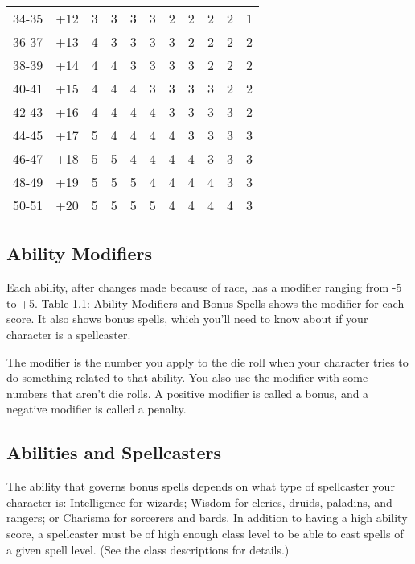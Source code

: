 \begin{table}[htb]
\begin{tabular}{*{11}{c}}
34-35 & +12 & 3 & 3 & 3 & 3 & 2 & 2 & 2 & 2 & 1\\
36-37 & +13 & 4 & 3 & 3 & 3 & 3 & 2 & 2 & 2 & 2\\
38-39 & +14 & 4 & 4 & 3 & 3 & 3 & 3 & 2 & 2 & 2\\
40-41 & +15 & 4 & 4 & 4 & 3 & 3 & 3 & 3 & 2 & 2\\
42-43 & +16 & 4 & 4 & 4 & 4 & 3 & 3 & 3 & 3 & 2\\
44-45 & +17 & 5 & 4 & 4 & 4 & 4 & 3 & 3 & 3 & 3\\
46-47 & +18 & 5 & 5 & 4 & 4 & 4 & 4 & 3 & 3 & 3\\
48-49 & +19 & 5 & 5 & 5 & 4 & 4 & 4 & 4 & 3 & 3\\
50-51 & +20 & 5 & 5 & 5 & 5 & 4 & 4 & 4 & 4 & 3\\
\end{tabular}
\end{table}

\subsection{Ability Modifiers}

Each ability, after changes made because of race, has a modifier ranging from -5 
to +5. Table 1.1: Ability Modifiers and Bonus Spells shows the modifier for each score. 
It also shows bonus spells, which you'll need to know about if your character is 
a spellcaster.

The modifier is the number you apply to the die roll when your character tries 
to do something related to that ability. You also use the modifier with some numbers that aren't die rolls. 
A positive modifier is called a bonus, and a negative modifier is called a penalty.

\subsection{Abilities and Spellcasters}

The ability that governs bonus spells depends on what type of spellcaster your 
character is: Intelligence for wizards; Wisdom for clerics, druids, paladins, and 
rangers; or Charisma for sorcerers and bards. In addition to having a high ability 
score, a spellcaster must be of high enough class level to be able to cast spells 
of a given spell level. (See the class descriptions for details.)


